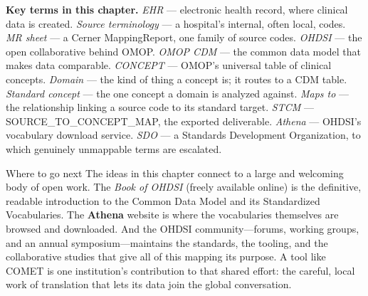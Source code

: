 \documentclass[12pt,openany]{book}
\begin{document}
{\sffamily\footnotesize\color{softgrey}
\textbf{Key terms in this chapter.}\quad
\textit{EHR} --- electronic health record, where clinical data is created.\;
\textit{Source terminology} --- a hospital's internal, often local, codes.\;
\textit{MR sheet} --- a Cerner MappingReport, one family of source codes.\;
\textit{OHDSI} --- the open collaborative behind OMOP.\;
\textit{OMOP CDM} --- the common data model that makes data comparable.\;
\textit{CONCEPT} --- OMOP's universal table of clinical concepts.\;
\textit{Domain} --- the kind of thing a concept is; it routes to a CDM table.\;
\textit{Standard concept} --- the one concept a domain is analyzed against.\;
\textit{Maps to} --- the relationship linking a source code to its standard target.\;
\textit{STCM} --- SOURCE\_TO\_CONCEPT\_MAP, the exported deliverable.\;
\textit{Athena} --- OHDSI's vocabulary download service.\;
\textit{SDO} --- a Standards Development Organization, to which genuinely unmappable terms are
escalated.}

\vspace{1.4em}
\begin{practice}{Where to go next}
The ideas in this chapter connect to a large and welcoming body of open work. The \emph{Book of
OHDSI} (freely available online) is the definitive, readable introduction to the Common Data Model and
its Standardized Vocabularies. The \textbf{Athena} website is where the vocabularies themselves are
browsed and downloaded. And the OHDSI community---forums, working groups, and an annual
symposium---maintains the standards, the tooling, and the collaborative studies that give all of this
mapping its purpose. A tool like COMET is one institution's contribution to that shared effort: the
careful, local work of translation that lets its data join the global conversation.
\end{practice}
\end{document}
